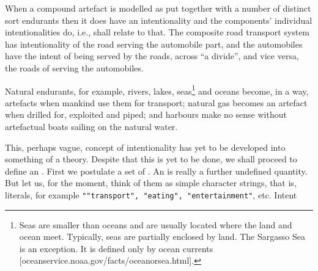 \mnewfoil

\noindent
\begynd
\pind When a compound artefact
\begynd
\pind  is modelled as put together \nyl
       with a number of distinct sort endurants
\pind  then it does have an intentionality and
\pind  the components' individual intentionalities do\ysfchg{}, \nyl i.e.,
shall relate to that.
\begynd
\pind The composite road transport system has intentionality \nyl
of the road serving the automobile part, and
\pind the automobiles have \nyl the
intent of being served by the roads, \nyl across ``a divide'', and vice
versa, \nyl the roads of serving the automobiles.
\afslut
\afslut
\afslut


\pos{\psno}{\mnewfoil}
\begynd
\pind Natural endurants, for example, 
\begynd
\pind rivers, lakes, seas\footnote{\LLLL Seas are smaller than
  oceans and are usually located where the land and ocean
  meet. Typically, seas are partially enclosed by land. The Sargasso
  Sea is an exception. It is defined only by ocean currents
  [oceanservice.noaa.gov/facts/oceanorsea.html].} and oceans 
  become, in a way, \nyl artefacts  when mankind use them for transport; 
\pind natural gas becomes an artefact \nyl when drilled for, exploited
      and piped; and 
\pind harbours make no sense without artefactual boats \nyl sailing on
      the natural water.  
\afslut
\afslut

\label{TheTypeIntent}
\begynd%
\pind This, perhaps vague, concept of intentionality \nyl has yet to
      be developed into something of a theory.
\pind Despite that this is yet to be done, \nyl we
      shall proceed to define an .
\pind First we postulate a set of .
\begynd
\pind An  is really a further undefined quantity.
\pind But let us, for the moment,  \nyl think of them as simple character strings,
      that is, literals, \nyl for example \texttt{""transport", "eating", "entertainment"}, etc.
\bp
\>\> Intent
\ep
\afslut
\afslut

\label{Intentionalities}


